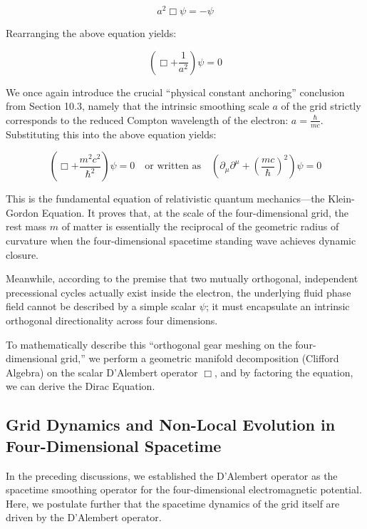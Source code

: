 \documentclass[12pt, a4paper]{article}
\begin{document}
\begin{equation}
a^2 \Box \psi = -\psi 
\end{equation}

Rearranging the above equation yields:

\begin{equation}
\left(\Box + \frac{1}{a^2}\right)\psi = 0
\end{equation}

We once again introduce the crucial ``physical constant anchoring'' conclusion from Section 10.3, namely that the intrinsic smoothing scale $a$ of the grid strictly corresponds to the reduced Compton wavelength of the electron: \textbf{$a = \frac{\hbar}{mc}$}. Substituting this into the above equation yields:

\begin{equation}
\left(\Box + \frac{m^2c^2}{\hbar^2}\right)\psi = 0 \quad \text{or written as} \quad \left(\partial_\mu \partial^\mu + \left(\frac{mc}{\hbar}\right)^2\right)\psi = 0
\end{equation}

This is the fundamental equation of relativistic quantum mechanics—the Klein-Gordon Equation. 
It proves that, at the scale of the four-dimensional grid, the rest mass $m$ of matter is essentially the reciprocal of the geometric radius of curvature when the four-dimensional spacetime standing wave achieves dynamic closure.

Meanwhile, according to the premise that two mutually orthogonal, independent precessional cycles actually exist inside the electron, the underlying fluid phase field cannot be described by a simple scalar $\psi$; it must encapsulate an intrinsic orthogonal directionality across four dimensions. 

To mathematically describe this ``orthogonal gear meshing on the four-dimensional grid,'' we perform a geometric manifold decomposition (Clifford Algebra) on the scalar D'Alembert operator $\Box$, and by factoring the equation, we can derive the Dirac Equation.

\subsection{Grid Dynamics and Non-Local Evolution in Four-Dimensional Spacetime}

In the preceding discussions, we established the D'Alembert operator as the spacetime smoothing operator for the four-dimensional electromagnetic potential. Here, we postulate further that the spacetime dynamics of the grid itself are driven by the D'Alembert operator.
\end{document}
